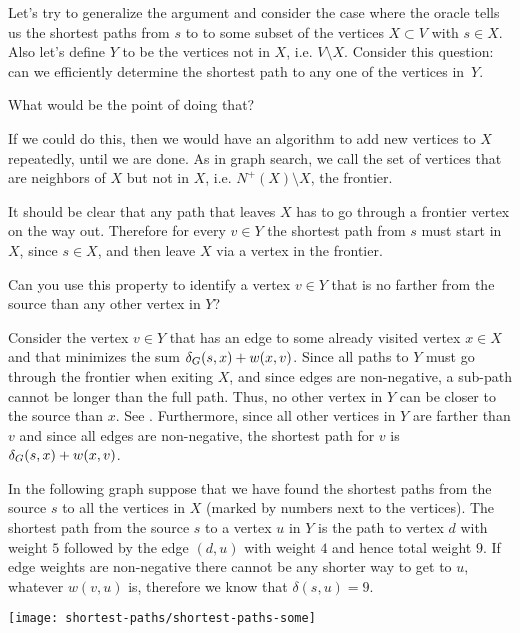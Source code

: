 Let's try to generalize the argument and consider the case where the
oracle tells us the shortest paths from $s$ to to some subset of the
vertices $X \subset V$ with $s \in X$.  
%
Also let's define $Y$ to be the vertices not in $X$, i.e. $V\setminus
X$.  
%
Consider this question: can we  efficiently determine the shortest path
to any one of the vertices in~$Y$.
\begin{question}
What would be the point of doing that? 
\end{question}
If we could do this, then we would have an algorithm to add new
vertices to $X$ repeatedly, until we are done.  As in graph search, we
call the set of vertices that are neighbors of $X$ but not in $X$,
i.e. $N^+(X) \setminus X$, the frontier.

It should be clear that any path that leaves $X$ has to go through a
frontier vertex on the way out.  Therefore for every $v \in Y$ the
shortest path from $s$ must start in $X$, since $s \in X$, and then
leave $X$ via a vertex in the frontier.
\begin{question}
Can you use this property to identify a vertex $v \in Y$ that is no
farther from the source than any other vertex in $Y$?
\end{question}
Consider the vertex $v \in Y$ that has an edge to some already visited
vertex $x \in X$ and that minimizes the sum $\delta_G(s,x) + w(x,v)$.
Since all paths to $Y$ must go through the frontier when exiting $X$,
and since edges are non-negative, a sub-path cannot be longer than the
full path.  Thus, no other vertex in $Y$ can be closer to the source
than $x$. See . Furthermore, since all other
vertices in $Y$ are farther than $v$ and since all edges are
non-negative, the shortest path for $v$ is $\delta_G(s,x) + w(x,v)$.


\begin{example}
  In the following graph suppose that we have found the shortest paths
  from the source $s$ to all the vertices in $X$ (marked by numbers
  next to the vertices).  The shortest path from the source $s$ to a
  vertex $u$ in $Y$ is the path to vertex $d$ with weight $5$ followed by
  the edge $(d,u)$ with weight $4$ and hence total weight $9$.  If
  edge weights are non-negative there cannot be any shorter way to get
  to $u$, whatever $w(v,u)$ is, therefore we know that $\delta(s,u) =
  9$.
\begin{center}
\texttt{[image: shortest-paths/shortest-paths-some]}
\end{center}
\label{ex:shortestpath::some}
\end{example}


